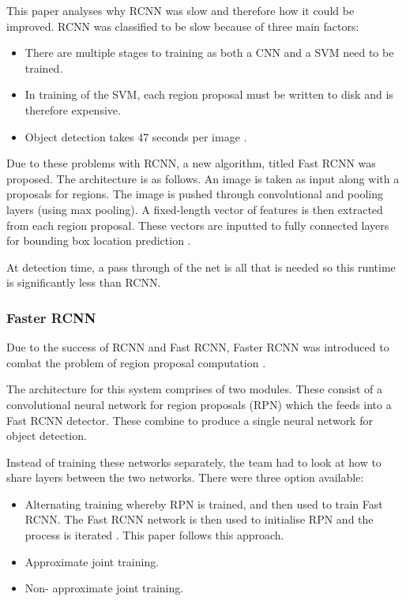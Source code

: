 This paper analyses why RCNN \parencite{rcnn} was slow and therefore how it could be improved.
RCNN was classified to be slow because of three main factors:
\begin{itemize}
	\item{There are multiple stages to training as both a CNN and a SVM need to
		be trained.}
	\item{In training of the SVM, each region proposal must be written to disk
		and is therefore expensive.}
	\item{Object detection takes 47 seconds per image \parencite{fastRcnn}.}
\end{itemize}

Due to these problems with RCNN, a new algorithm, titled Fast RCNN was proposed.
The architecture is as follows. An image is taken as input along with a
proposals for regions. The image is pushed through convolutional and pooling
layers (using max pooling). A fixed-length vector of features is then extracted
from each region proposal. These vectors are inputted to fully connected
layers for bounding box location prediction \parencite{fastRcnn}.

At detection time, a pass through of the net is all that is needed so this
runtime is significantly less than RCNN.

\subsubsection*{Faster RCNN}
Due to the success of RCNN and Fast RCNN, Faster RCNN was introduced to combat
the problem of region proposal computation \parencite{fasterRcnn}.

The architecture for this system comprises of two modules. These consist of a
convolutional neural network for region proposals (RPN) which the feeds into a Fast
RCNN detector. These combine to produce a single neural network for object
detection.

Instead of training these networks separately, the team had to look at how to
share layers between the two networks. There were three option available:
\begin{itemize}
    \item{Alternating training whereby RPN is trained, and then used to train
        Fast RCNN. The Fast RCNN network is then used to initialise RPN and the
		process is iterated \parencite{fasterRcnn}. This paper follows this approach.}
    \item{Approximate joint training.}
    \item{Non- approximate joint training.}
\end{itemize}

